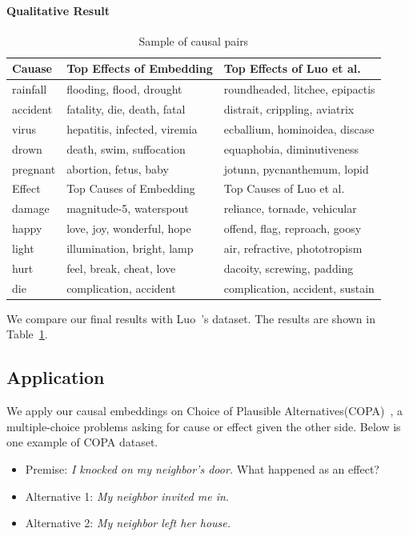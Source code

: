 \paragraph{Qualitative Result}
\begin{table}[!ht]
	\caption{Sample of causal pairs}
	\label{tab:qualitative}
	\centering
	\small
		\begin{tabular}{|l|l|l|}
			\hline 
			Cauase & Top Effects of Embedding& Top Effects of Luo et al. \cite{luo2016commonsense} \\
			\hline
			rainfall & flooding, flood, drought& roundheaded, litchee, epipactis\\
			accident & fatality, die, death, fatal& distrait, crippling, aviatrix\\
			virus & hepatitis, infected, viremia&  ecballium, hominoidea, discase\\
			drown & death, swim, suffocation& equaphobia, diminutiveness\\
			pregnant & abortion, fetus, baby&jotunn, pycnanthemum, lopid \\
			\hline 
			\hline
			Effect & Top Causes of Embedding& Top Causes of Luo et al. \cite{luo2016commonsense} \\
			\hline
			damage & magnitude-5, waterspout&reliance, tornade, vehicular\\
			happy & love, joy, wonderful, hope&offend, flag, reproach, goosy\\
			light & illumination, bright, lamp& air, refractive, phototropism\\
			hurt & feel, break, cheat, love& dacoity, screwing, padding\\
			die & complication, accident& complication, accident, sustain\\
			\hline
	\end{tabular}
\end{table}
We compare our final results with Luo~\cite{luo2016commonsense}'s dataset. The results are shown in Table~\ref{tab:qualitative}.



\subsection{Application}
We apply our causal embeddings on Choice of Plausible Alternatives(COPA)~\cite{roemmele2011choice}, a multiple-choice problems asking for cause or effect given the other side. Below is one example of COPA dataset.

\begin{example}
	\label{ex:copa}
	\noindent
	\begin{itemize}
		\item[] Premise: \emph{I knocked on my neighbor's door.} What
		happened as an effect?
		\item[] Alternative 1: \emph{My neighbor invited me in.}
		\item[] Alternative 2: \emph{My neighbor left her house.}
	\end{itemize}
\end{example}

